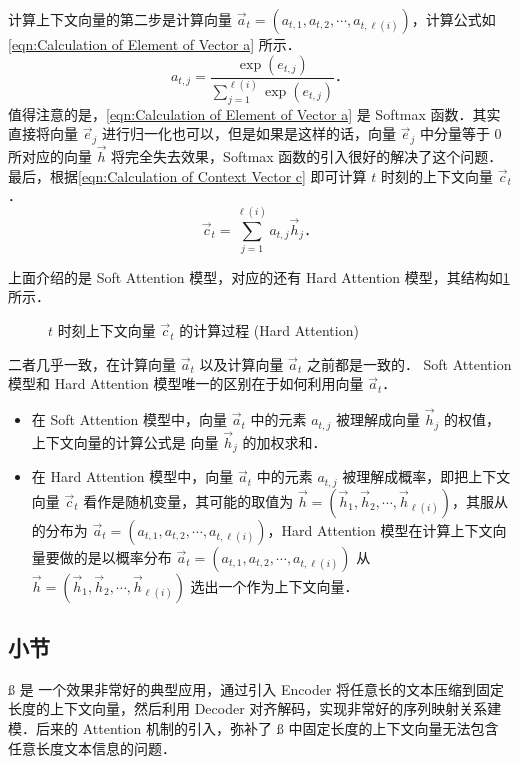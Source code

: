 计算上下文向量的第二步是计算向量 $\vec{a}_t = (a_{t, 1}, a_{t, 2}, \cdots, a_{t, \ell(i)})$，计算公式如\cref{eqn:Calculation of Element of Vector a} 所示．%
%
\begin{equation}\label{eqn:Calculation of Element of Vector a}
  a_{t, j} = \frac{\exp(e_{t, j})}{\sum_{j = 1}^{\ell(i)}\exp(e_{t, j})}\text{．}
\end{equation}%
%
值得注意的是，\cref{eqn:Calculation of Element of Vector a} 是 Softmax 函数．其实直接将向量 $\vec{e}_j$ 进行归一化也可以，但是如果是这样的话，向量 $\vec{e}_j$ 中分量等于 $0$ 所对应的向量 $\vec{h}$ 将完全失去效果，Softmax 函数的引入很好的解决了这个问题．最后，根据\cref{eqn:Calculation of Context Vector c} 即可计算 $t$ 时刻的上下文向量 $\vec{c}_t$．%
%
\begin{equation}\label{eqn:Calculation of Context Vector c}
  \vec{c}_t = \sum_{j = 1}^{\ell(i)}a_{t, j}\vec{h}_j\text{．}
\end{equation}%

上面介绍的是 Soft Attention 模型，对应的还有 Hard Attention 模型，其结构如\cref{fig:Calculation of Context Vector at t Hard} 所示．%
%
\begin{figure}[!htb]
  \centering
  \scalebox{0.45}{}
  \caption{$t$ 时刻上下文向量 $\vec{c}_t$ 的计算过程 (Hard Attention)}
  \label{fig:Calculation of Context Vector at t Hard}
\end{figure}%
%
二者几乎一致，在计算向量 $\vec{a}_t$ 以及计算向量 $\vec{a}_t$ 之前都是一致的． Soft Attention 模型和 Hard Attention 模型唯一的区别在于如何利用向量 $\vec{a}_t$．%
%
\begin{itemize}
\item 在 Soft Attention 模型中，向量 $\vec{a}_t$ 中的元素 $a_{t, j}$ 被理解成向量 $\vec{h}_j$ 的权值，上下文向量的计算公式是 向量 $\vec{h}_j$ 的加权求和．
\item 在 Hard Attention 模型中，向量 $\vec{a}_t$ 中的元素 $a_{t, j}$ 被理解成概率，即把上下文向量 $\vec{c}_t$ 看作是随机变量，其可能的取值为 $\vec{h} = (\vec{h}_1, \vec{h}_2, \cdots, \vec{h}_{\ell(i)})$，其服从的分布为 $\vec{a}_t = (a_{t, 1}, a_{t, 2}, \cdots, a_{t, \ell(i)})$，Hard Attention 模型在计算上下文向量要做的是以概率分布 $\vec{a}_t = (a_{t, 1}, a_{t, 2}, \cdots, a_{t, \ell(i)})$ 从 $\vec{h} = (\vec{h}_1, \vec{h}_2, \cdots, \vec{h}_{\ell(i)})$ 选出一个作为上下文向量．
\end{itemize}

\subsection{小节}
\indent\ss{} 是 \lstm{} 一个效果非常好的典型应用，通过引入 Encoder 将任意长的文本压缩到固定长度的上下文向量，然后利用 Decoder 对齐解码，实现非常好的序列映射关系建模．后来的 Attention 机制的引入，弥补了 \ss{} 中固定长度的上下文向量无法包含任意长度文本信息的问题．